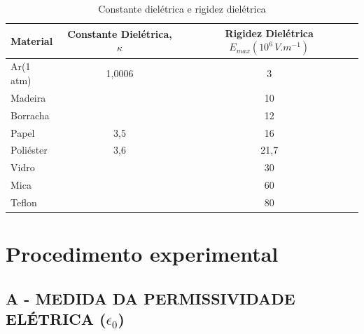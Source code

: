 	\begin{table}[H]
		\centering
	\begin{tabular}{l|c|c}
		\hline 
		Material & Constante Dielétrica, $\kappa$ & Rigidez Dielétrica $E_{max} (10^{6}\,V.m^{-1})$ \\ 
		\hline 
		Ar(1 atm) & 1,0006 & 3 \\ 
        Madeira & & 10 \\
        Borracha & & 12 \\
	Papel & 3,5 & 16 \\ 
        Poliéster & 3,6 & 21,7 \\ 
        Vidro & & 30 \\
        Mica & & 60 \\
        Teflon & & 80 \\
        
		\hline 
	\end{tabular} 
		\caption{Constante dielétrica e rigidez dielétrica}
		\label{tab:rigidez-materiais}
	\end{table}

	\section{Procedimento experimental}
	
	\subsection{A - MEDIDA DA PERMISSIVIDADE ELÉTRICA ($\epsilon_{0}$)}
	
